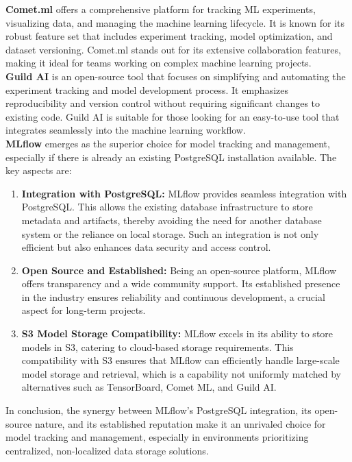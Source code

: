 \textbf{Comet.ml} \cite{CometMLWeb} offers a comprehensive platform for tracking ML experiments, visualizing data, and managing the machine learning lifecycle. It is known for its robust feature set that includes experiment tracking, model optimization, and dataset versioning. Comet.ml stands out for its extensive collaboration features, making it ideal for teams working on complex machine learning projects. \\

\textbf{Guild AI} \cite{GuildAIWeb} is an open-source tool that focuses on simplifying and automating the experiment tracking and model development process. It emphasizes reproducibility and version control without requiring significant changes to existing code. Guild AI is suitable for those looking for an easy-to-use tool that integrates seamlessly into the machine learning workflow. \\

\textbf{MLflow} emerges as the superior choice for model tracking and management, especially if there is already an existing PostgreSQL installation available. 
The key aspects are: 
\begin{enumerate}
    \item \textbf{Integration with PostgreSQL:} MLflow provides seamless integration with PostgreSQL. This allows the existing database infrastructure to store metadata and artifacts, thereby avoiding the need for another database system or the reliance on local storage. Such an integration is not only efficient but also enhances data security and access control.
    \item \textbf{Open Source and Established:} Being an open-source platform, MLflow offers transparency and a wide community support. Its established presence in the industry ensures reliability and continuous development, a crucial aspect for long-term projects.
    \item \textbf{S3 Model Storage Compatibility:} MLflow excels in its ability to store models in S3, catering to cloud-based storage requirements. This compatibility with S3 ensures that MLflow can efficiently handle large-scale model storage and retrieval, which is a capability not uniformly matched by alternatives such as TensorBoard, Comet ML, and Guild AI.
\end{enumerate}

In conclusion, the synergy between MLflow's PostgreSQL integration, its open-source nature, and its established reputation make it an unrivaled choice for model tracking and management, especially in environments prioritizing centralized, non-localized data storage solutions.  \\


